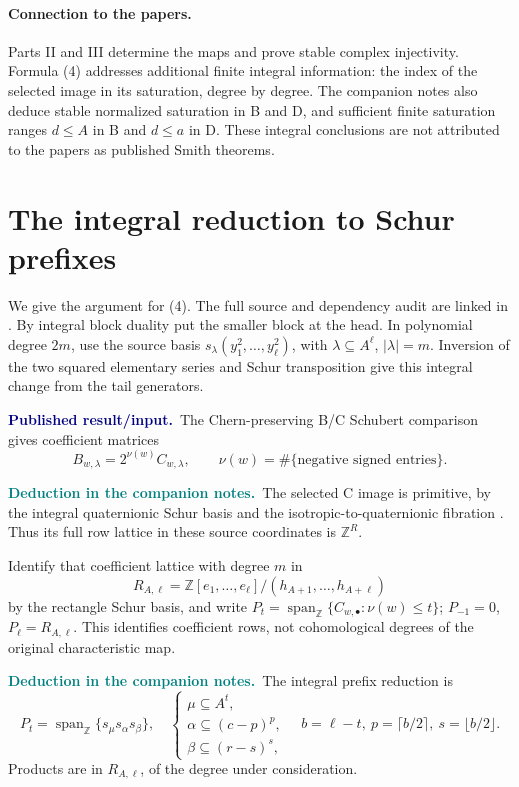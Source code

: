\documentclass[11pt,letterpaper]{article}
\newcommand{\Z}{\mathbb Z}
\newcommand{\published}{\textcolor{navy}{\textbf{Published result/input.}}\ }
\newcommand{\deduction}{\textcolor{teal}{\textbf{Deduction in the companion notes.}}\ }
\begin{document}
\paragraph{Connection to the papers.}
Parts II and III determine the maps and prove stable complex injectivity.
Formula (4) addresses additional finite integral information: the index
of the selected image in its saturation, degree by degree.
The companion notes also deduce stable normalized saturation in B and D,
and sufficient finite saturation ranges \(d\le A\) in B and \(d\le a\)
in D. These integral conclusions are not attributed to the papers as
published Smith theorems.

\newpage
\section{The integral reduction to Schur prefixes}
We give the argument for (4). The full source and dependency audit are
linked in \cite{Repo}. By integral block duality put the smaller block
at the head. In polynomial degree \(2m\), use the source basis
\(s_\lambda(y_1^2,\ldots,y_\ell^2)\), with
\(\lambda\subseteq A^\ell\), \(|\lambda|=m\).
Inversion of the two squared elementary series and Schur transposition
give this integral change from the tail generators.

\published The Chern-preserving B/C Schubert comparison
\cite{BKTIG} gives coefficient matrices
\[
 B_{w,\lambda}=2^{\nu(w)}C_{w,\lambda},\qquad
 \nu(w)=\#\{\text{negative signed entries}\}.
 \tag{7}
\]

\deduction The selected C image is primitive, by the integral quaternionic Schur
basis and the isotropic-to-quaternionic fibration \cite{PR}.
Thus its full row lattice in these source coordinates is \(\Z^R\).

Identify that coefficient lattice with degree \(m\) in
\[
 R_{A,\ell}=\Z[e_1,\ldots,e_\ell]/
             (h_{A+1},\ldots,h_{A+\ell})
\]
by the rectangle Schur basis, and write
\(P_t=\operatorname{span}_{\Z}\{C_{w,\bullet}:\nu(w)\le t\}\);
\(P_{-1}=0\), \(P_\ell=R_{A,\ell}\).
This identifies coefficient rows, not cohomological degrees of the
original characteristic map.

\deduction The integral prefix reduction is
\[
 P_t=\operatorname{span}_{\Z}\{s_\mu s_\alpha s_\beta\},\quad
 \begin{cases}
 \mu\subseteq A^t,\\
 \alpha\subseteq(c-p)^p,\\
 \beta\subseteq(r-s)^s,
 \end{cases}
 \quad
 b=\ell-t,\ p=\lceil b/2\rceil,\ s=\lfloor b/2\rfloor .
 \tag{8}
\]
Products are in \(R_{A,\ell}\), of the degree under consideration.
\end{document}
